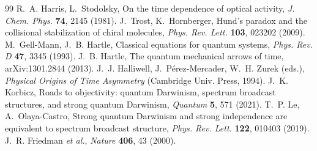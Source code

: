 \documentclass[11pt]{article}
\begin{document}
\begin{thebibliography}{99}
 R.~A. Harris, L.~Stodolsky, On the time dependence of optical activity, \emph{J. Chem. Phys.} \textbf{74}, 2145 (1981).
 J.~Trost, K.~Hornberger, Hund's paradox and the collisional stabilization of chiral molecules, \emph{Phys. Rev. Lett.} \textbf{103}, 023202 (2009).
 M.~Gell-Mann, J.~B. Hartle, Classical equations for quantum systems, \emph{Phys. Rev. D} \textbf{47}, 3345 (1993).
 J.~B. Hartle, The quantum mechanical arrows of time, arXiv:1301.2844 (2013).
 J.~J. Halliwell, J.~P\'erez-Mercader, W.~H. Zurek (eds.), \emph{Physical Origins of Time Asymmetry} (Cambridge Univ. Press, 1994).
 J.~K. Korbicz, Roads to objectivity: quantum Darwinism, spectrum broadcast structures, and strong quantum Darwinism, \emph{Quantum} \textbf{5}, 571 (2021).
 T.~P. Le, A.~Olaya-Castro, Strong quantum Darwinism and strong independence are equivalent to spectrum broadcast structure, \emph{Phys. Rev. Lett.} \textbf{122}, 010403 (2019).
 J.~R. Friedman \emph{et al.}, \emph{Nature} \textbf{406}, 43 (2000).
\end{thebibliography}
\end{document}
